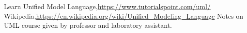 \begin{thebibliography}{99999}
\singlespace\normalsize

 Learn Unified Model Language,\url{https://www.tutorialspoint.com/uml/}
 Wikipedia,\url{https://en.wikipedia.org/wiki/Unified_Modeling_Language}
 Notes on UML course given by professor and laboratory assistant.



\end{thebibliography}

